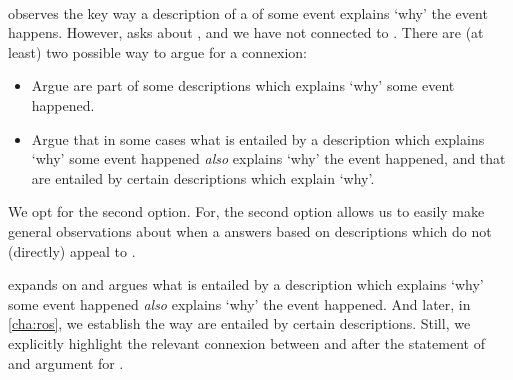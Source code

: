 \paragraph*{\progExII{}}


\begin{note}
  \progExI{} observes the key way a description of a \se{} of some event explains `why' the event happens.
  However, \qWhy{} asks about , and we have not connected  to .
  There are (at least) two possible way to argue for a connexion:
  \begin{itemize}
  \item
    Argue  are part of some descriptions which explains `why' some event happened.
  \item
    Argue that in some cases what is entailed by a description which explains `why' some event happened \emph{also} explains `why' the event happened, and that  are entailed by certain descriptions which explain `why'.
  \end{itemize}
  We opt for the second option.
  For, the second option allows us to easily make general observations about when a \ros{} answers \qWhy{} based on descriptions which do not (directly) appeal to .

  \progExII{} expands on \progExI{} and argues what is entailed by a description which explains `why' some event happened \emph{also} explains `why' the event happened.
  And later, in \autoref{cha:ros}, we establish the way  are entailed by certain descriptions.
  Still, we explicitly highlight the relevant connexion between \progExII{} and \ros{} after the statement of and argument for \progExII{}.
\end{note}


